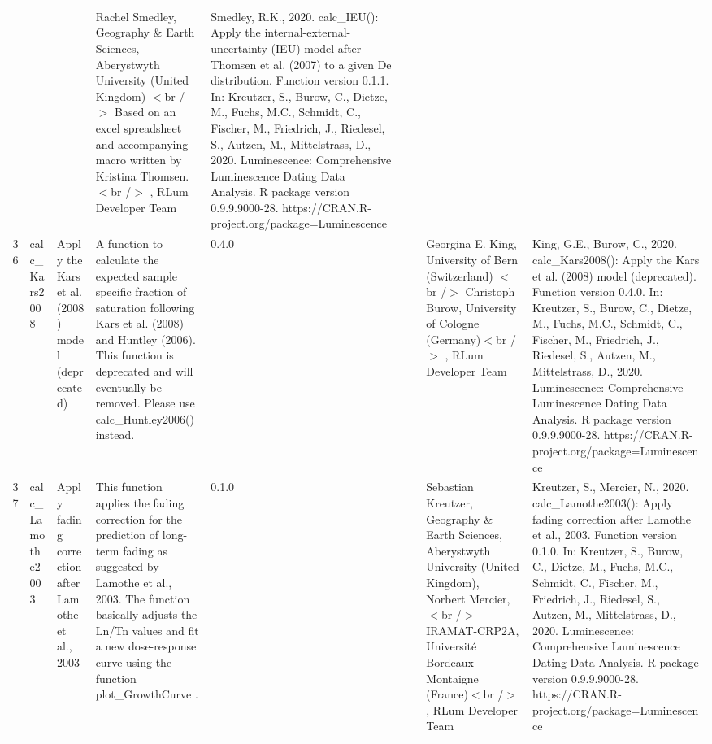 \begin{table}[ht]
\begin{tabular}{rllllllll}
 &  &  & Rachel Smedley, Geography \& Earth Sciences, Aberystwyth University (United Kingdom)  $<$br /$>$ Based on an excel spreadsheet and accompanying macro written by Kristina Thomsen.$<$br /$>$ , RLum Developer Team & Smedley, R.K., 2020. calc\_IEU(): Apply the internal-external-uncertainty (IEU) model after Thomsen et al. (2007) to a given De distribution. Function version 0.1.1. In: Kreutzer, S., Burow, C., Dietze, M., Fuchs, M.C., Schmidt, C., Fischer, M., Friedrich, J., Riedesel, S., Autzen, M., Mittelstrass, D., 2020. Luminescence: Comprehensive Luminescence Dating Data Analysis. R package version 0.9.9.9000-28. https://CRAN.R-project.org/package=Luminescence
 \\ 
  36 & calc\_Kars2008 & Apply the Kars et al. (2008) model (deprecated) & A function to calculate the expected sample specific fraction of saturation following Kars et al. (2008) and Huntley (2006). This function is deprecated and will eventually be removed. Please use  calc\_Huntley2006()  instead. & 0.4.0
 &  &  & Georgina E. King, University of Bern (Switzerland)  $<$br /$>$ Christoph Burow, University of Cologne (Germany)$<$br /$>$ , RLum Developer Team & King, G.E., Burow, C., 2020. calc\_Kars2008(): Apply the Kars et al. (2008) model (deprecated). Function version 0.4.0. In: Kreutzer, S., Burow, C., Dietze, M., Fuchs, M.C., Schmidt, C., Fischer, M., Friedrich, J., Riedesel, S., Autzen, M., Mittelstrass, D., 2020. Luminescence: Comprehensive Luminescence Dating Data Analysis. R package version 0.9.9.9000-28. https://CRAN.R-project.org/package=Luminescence
 \\ 
  37 & calc\_Lamothe2003 & Apply fading correction after Lamothe et al., 2003 & This function applies the fading correction for the prediction of long-term fading as suggested by Lamothe et al., 2003. The function basically adjusts the Ln/Tn values and fit a new dose-response curve using the function  plot\_GrowthCurve . & 0.1.0
 &  &  & Sebastian Kreutzer, Geography \& Earth Sciences, Aberystwyth University (United Kingdom), Norbert Mercier,$<$br /$>$ IRAMAT-CRP2A, Université Bordeaux Montaigne (France)$<$br /$>$ , RLum Developer Team & Kreutzer, S., Mercier, N., 2020. calc\_Lamothe2003(): Apply fading correction after Lamothe et al., 2003. Function version 0.1.0. In: Kreutzer, S., Burow, C., Dietze, M., Fuchs, M.C., Schmidt, C., Fischer, M., Friedrich, J., Riedesel, S., Autzen, M., Mittelstrass, D., 2020. Luminescence: Comprehensive Luminescence Dating Data Analysis. R package version 0.9.9.9000-28. https://CRAN.R-project.org/package=Luminescence

\end{tabular}
\end{table}
